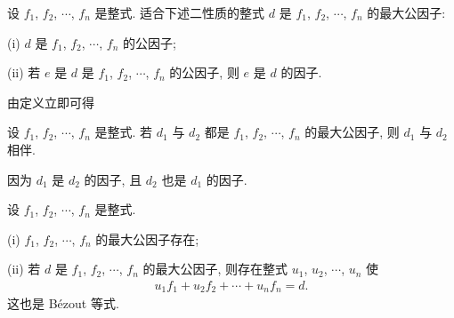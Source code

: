 \begin{definition}
    设 $f_1$, $f_2$, $\cdots$, $f_n$ 是整式. 适合下述二性质的整式 $d$ 是 $f_1$, $f_2$, $\cdots$, $f_n$ 的最大公因子:

    (i) $d$ 是 $f_1$, $f_2$, $\cdots$, $f_n$ 的公因子;

    (ii) 若 $e$ 是 $d$ 是 $f_1$, $f_2$, $\cdots$, $f_n$ 的公因子, 则 $e$ 是 $d$ 的因子.
\end{definition}

由定义立即可得
\begin{proposition}
    设 $f_1$, $f_2$, $\cdots$, $f_n$ 是整式. 若 $d_1$ 与 $d_2$ 都是 $f_1$, $f_2$, $\cdots$, $f_n$ 的最大公因子, 则 $d_1$ 与 $d_2$ 相伴.
\end{proposition}

\begin{pf}
    因为 $d_1$ 是 $d_2$ 的因子, 且 $d_2$ 也是 $d_1$ 的因子.
\end{pf}

\begin{proposition}
    设 $f_1$, $f_2$, $\cdots$, $f_n$ 是整式.

    (i) $f_1$, $f_2$, $\cdots$, $f_n$ 的最大公因子存在;

    (ii) 若 $d$ 是 $f_1$, $f_2$, $\cdots$, $f_n$ 的最大公因子, 则存在整式 $u_1$, $u_2$, $\cdots$, $u_n$ 使
    \begin{align*}
        u_1 f_1 + u_2 f_2 + \cdots + u_n f_n = d.
    \end{align*}
    这也是 Bézout 等式.
\end{proposition}

